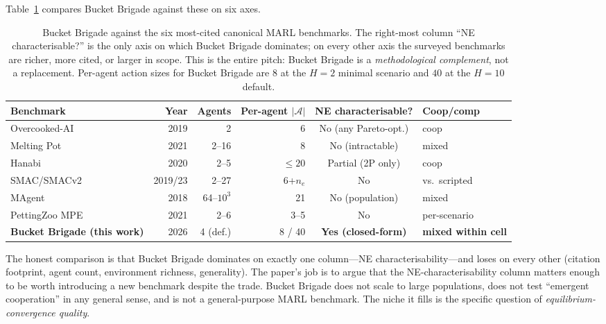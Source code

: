 \documentclass{anvil-paper}
\begin{document}
Table~\ref{tab:bench} compares Bucket Brigade against these on six axes.

\begin{table}[t]
  \centering
  \small
  \setlength{\tabcolsep}{4pt}
  \begin{tabular}{lrrrcl}
    \toprule
    Benchmark & Year & Agents & Per-agent $|\mathcal{A}|$ & NE characterisable? & Coop/comp \\
    \midrule
    Overcooked-AI~\citep{overcooked2019}      & 2019      & 2        & 6          & No (any Pareto-opt.) & coop \\
    Melting Pot~\citep{meltingpot2021}        & 2021      & 2--16    & 8          & No (intractable)     & mixed \\
    Hanabi~\citep{hanabi2020}                 & 2020      & 2--5     & $\leq 20$  & Partial (2P only)    & coop \\
    SMAC/SMACv2~\citep{smac2019,smacv2_2023}  & 2019/23   & 2--27    & 6+$n_e$    & No                   & vs.\ scripted \\
    MAgent~\citep{magent2018}                 & 2018      & 64--$10^3$ & 21       & No (population)      & mixed \\
    PettingZoo MPE~\citep{pettingzoo2021}     & 2021      & 2--6     & 3--5       & No                   & per-scenario \\
    \textbf{Bucket Brigade (this work)}       & 2026      & 4 (def.) & 8 / 40     & \textbf{Yes (closed-form)} & \textbf{mixed within cell} \\
    \bottomrule
  \end{tabular}
  \caption{Bucket Brigade against the six most-cited canonical MARL
  benchmarks. The right-most column ``NE characterisable?'' is the only
  axis on which Bucket Brigade dominates; on every other axis the
  surveyed benchmarks are richer, more cited, or larger in scope. This is
  the entire pitch: Bucket Brigade is a \emph{methodological complement},
  not a replacement. Per-agent action sizes for Bucket Brigade are
  $8$ at the $H{=}2$ minimal scenario and $40$ at the $H{=}10$ default.}
  \label{tab:bench}
\end{table}

The honest comparison is that Bucket Brigade dominates on exactly one
column---NE characterisability---and loses on every other (citation
footprint, agent count, environment richness, generality). The paper's job
is to argue that the NE-characterisability column matters enough to be worth
introducing a new benchmark despite the trade. Bucket Brigade does not
scale to large populations, does not test ``emergent cooperation'' in
any general sense, and is not a general-purpose MARL benchmark. The
niche it fills is the specific question of
\emph{equilibrium-convergence quality}.
\end{document}
